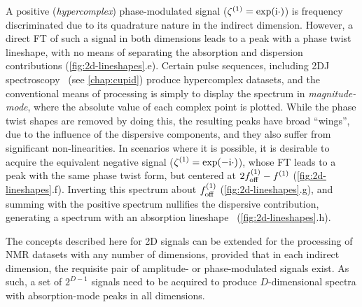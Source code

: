 A positive (\emph{hypercomplex}) phase-modulated signal ($\zeta^{(1)}
= \exp(\mathrm{i} \cdot)$) is frequency discriminated due to
its quadrature nature in the indirect dimension. However, a direct \ac{FT} of
such a signal in both dimensions leads to a peak with a phase twist lineshape,
with no means of
separating the absorption and dispersion contributions
(\cref{fig:2d-lineshapes}.e). Certain pulse
sequences, including \ac{2DJ} spectroscopy~\cite{Aue1976,Morris2009} (see
\cref{chap:cupid}) produce hypercomplex datasets,
and the conventional means of processing is simply to display the
spectrum in \emph{magnitude-mode}, where the absolute value of each complex
point is plotted. While the phase twist shapes are removed by doing this, the
resulting peaks have broad ``wings'', due to the influence of the
dispersive components, and they also suffer from significant non-linearities.
In scenarios where it is possible, it is desirable to acquire the equivalent
negative signal ($\zeta^{(1)} = \exp(-\mathrm{i} \cdot)$), whose \ac{FT} leads to a
peak with the same phase twist form, but centered at $2f_{\mathrm{off}}^{(1)} - f^{(1)}$
(\cref{fig:2d-lineshapes}.f).
Inverting this spectrum about $f_{\mathrm{off}}^{(1)}$ (\cref{fig:2d-lineshapes}.g), and summing with the positive
spectrum nullifies the dispersive contribution, generating a spectrum with an
absorption lineshape~\cite{Davis1992} (\cref{fig:2d-lineshapes}.h).

The concepts described here for \ac{2D} signals can be extended for the
processing of \ac{NMR} datasets with any number of dimensions, provided that in
each indirect dimension, the requisite pair of amplitude- or phase-modulated
signals exist. As such, a set of $2^{D-1}$ signals need to be acquired to
produce $D$-dimensional spectra with absorption-mode peaks in all dimensions.

